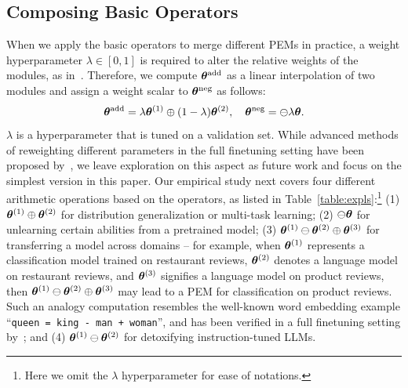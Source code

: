\subsection{Composing Basic Operators}
When we apply the basic operators to merge different PEMs in practice, a weight hyperparameter $\lambda\in[0,1]$ is required to alter the relative weights of the modules, as in~\citet{ilharco2022editing,wang2022adamix}. Therefore, we compute ${\bm{\theta}}^{\text{add}}$ as a linear interpolation of two modules and assign a weight scalar to ${\bm{\theta}}^{\text{neg}}$ as follows:
\begin{equation}
    {\bm{\theta}}^{\text{add}} = \lambda {\bm{\theta}}^{(1)} \oplus (1-\lambda) {\bm{\theta}}^{(2)}, \quad {\bm{\theta}}^{\text{neg}}=\ominus \lambda{\bm{\theta}}.
\end{equation}
$\lambda$ is a hyperparameter that is tuned on a validation set. 
While advanced methods of reweighting different parameters in the full finetuning setting have been proposed by~\citet{matena2022merging,jin2022dataless}, we leave exploration on this aspect as future work and focus on the simplest version in this paper.
Our empirical study next covers four different arithmetic operations based on the operators, as listed in Table~\ref{table:expls}:\footnote{Here we omit the $\lambda$ hyperparameter for ease of notations.} (1) ${\bm{\theta}}^{(1)} \oplus {\bm{\theta}}^{(2)}$ for distribution generalization or multi-task learning; (2) $\ominus {\bm{\theta}}$ for unlearning certain abilities from a pretrained model; (3) ${\bm{\theta}}^{(1)} \ominus {\bm{\theta}}^{(2)} \oplus {\bm{\theta}}^{(3)}$ for transferring a model across domains -- for example, when ${\bm{\theta}}^{(1)}$ represents a classification model trained on restaurant reviews, ${\bm{\theta}}^{(2)}$ denotes a language model on restaurant reviews, and ${\bm{\theta}}^{(3)}$ signifies a language model on product reviews, then ${\bm{\theta}}^{(1)} \ominus {\bm{\theta}}^{(2)} \oplus {\bm{\theta}}^{(3)}$ may lead to a PEM for classification on product reviews. Such an analogy computation resembles the well-known word embedding example ``\texttt{queen = king - man + woman}'', and has been verified in a full finetuning setting by~\citet{ilharco2022editing}; and (4) ${\bm{\theta}}^{(1)} \ominus {\bm{\theta}}^{(2)}$ for detoxifying instruction-tuned LLMs. 




